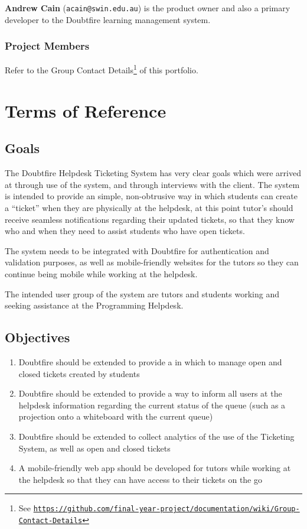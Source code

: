 \documentclass[12pt,a4paper,]{article}
\renewcommand{\href}[2]{#2\footnote{See \texttt{\url{#1}}}}
\providecommand{\tightlist}{%
  \setlength{\itemsep}{0pt}\setlength{\parskip}{0pt}}
\begin{document}
\textbf{Andrew Cain} (\texttt{acain@swin.edu.au}) is the product owner
and also a primary developer to the Doubtfire learning management
system.

\subsubsection{Project Members}\label{project-members}

Refer to the
\href{https://github.com/final-year-project/documentation/wiki/Group-Contact-Details}{Group
Contact Details} of this portfolio.

\section{Terms of Reference}\label{terms-of-reference}

\subsection{Goals}\label{goals}

The Doubtfire Helpdesk Ticketing System has very clear goals which were
arrived at through use of the system, and through interviews with the
client. The system is intended to provide an simple, non-obtrusive way
in which students can create a ``ticket'' when they are physically at
the helpdesk, at this point tutor's should receive seamless
notifications regarding their updated tickets, so that they know who and
when they need to assist students who have open tickets.

The system needs to be integrated with Doubtfire for authentication and
validation purposes, as well as mobile-friendly websites for the tutors
so they can continue being mobile while working at the helpdesk.

The intended user group of the system are tutors and students working
and seeking assistance at the Programming Helpdesk.

\subsection{Objectives}\label{objectives}

\begin{enumerate}
\def\labelenumi{\arabic{enumi}.}
\tightlist
\item
  Doubtfire should be extended to provide a in which to manage open and
  closed tickets created by students
\item
  Doubtfire should be extended to provide a way to inform all users at
  the helpdesk information regarding the current status of the queue
  (such as a projection onto a whiteboard with the current queue)
\item
  Doubtfire should be extended to collect analytics of the use of the
  Ticketing System, as well as open and closed tickets
\item
  A mobile-friendly web app should be developed for tutors while working
  at the helpdesk so that they can have access to their tickets on the
  go
\end{enumerate}
\end{document}
